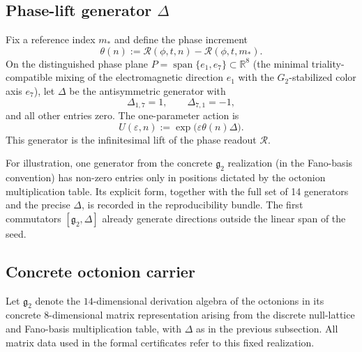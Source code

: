 \documentclass[11pt]{amsart}
\begin{document}
\subsection{Phase-lift generator \texorpdfstring{$\Delta$}{Delta}}

Fix a reference index \(m_\ast\) and define the phase increment
\[
\theta(n):=\mathcal{R}(\phi,t,n)-\mathcal{R}(\phi,t,m_\ast).
\]
On the distinguished phase plane \(P=\operatorname{span}\{e_1,e_7\}\subset\mathbb{R}^8\) (the minimal triality-compatible mixing of the electromagnetic direction \(e_1\) with the \(G_2\)-stabilized color axis \(e_7\)), let \(\Delta\) be the antisymmetric generator with
\[
\Delta_{1,7}=1,\qquad\Delta_{7,1}=-1,
\]
and all other entries zero. The one-parameter action is
\[
U(\varepsilon,n):=\exp\bigl(\varepsilon\theta(n)\Delta\bigr).
\]
This generator is the infinitesimal lift of the phase readout \(\mathcal{R}\).

For illustration, one generator from the concrete \(\mathfrak{g}_2\) realization (in the Fano-basis convention) has non-zero entries only in positions dictated by the octonion multiplication table. Its explicit form, together with the full set of 14 generators and the precise \(\Delta\), is recorded in the reproducibility bundle. The first commutators \([\mathfrak{g}_2,\Delta]\) already generate directions outside the linear span of the seed.

\subsection{Concrete octonion carrier}

Let \(\mathfrak{g}_2\) denote the \(14\)-dimensional derivation algebra of the octonions in its concrete \(8\)-dimensional matrix representation arising from the discrete null-lattice and Fano-basis multiplication table, with \(\Delta\) as in the previous subsection. All matrix data used in the formal certificates refer to this fixed realization.
\end{document}
